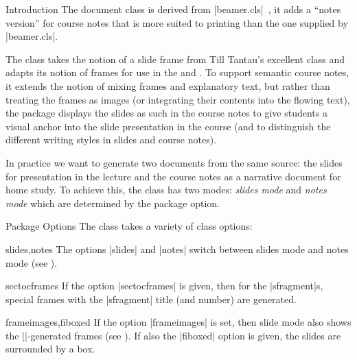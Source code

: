 \begin{sfragment}{Introduction}
  The  document class is derived from |beamer.cls|~\cite{beamerclass:on},
it adds a ``notes version'' for course notes that is more suited to printing than the one
supplied by |beamer.cls|.

The  class takes the notion of a slide frame from Till Tantau's excellent
 class and adapts its notion of frames for use in the \sTeX and \OMDoc. To
support semantic course notes, it extends the notion of mixing frames and explanatory
text, but rather than treating the frames as images (or integrating their contents into
the flowing text), the  package displays the slides as such in the course
notes to give students a visual anchor into the slide presentation in the course (and to
distinguish the different writing styles in slides and course notes).

In practice we want to generate two documents from the same source: the slides for
presentation in the lecture and the course notes as a narrative document for home
study. To achieve this, the  class has two modes: \emph{slides mode} and
\emph{notes mode} which are determined by the package option. 
\end{sfragment}

\begin{sfragment}{Package Options}
  The  class takes a variety of class options:

  \begin{variable}{slides,notes} The options |slides| and |notes| switch between slides
    mode and notes mode (see ).
  \end{variable}

  \begin{variable}{sectocframes} If the option |sectocframes| is given, then for the
    |sfragment|s, special frames with the |sfragment| title (and number) are generated.
  \end{variable}

  \begin{variable}{frameimages,fiboxed}
    If the option |frameimages| is set, then slide mode also shows the
    |\frameimage|-generated frames (see ). If also the |fiboxed|
    option is given, the slides are surrounded by a box.
  \end{variable}
\end{sfragment}

